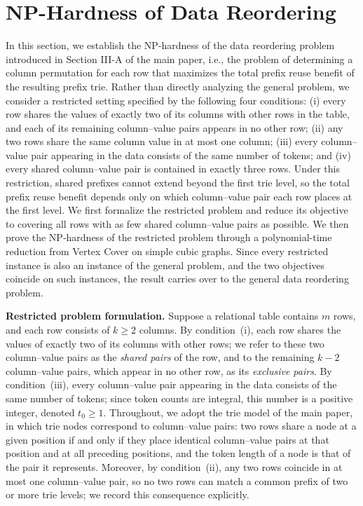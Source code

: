 \section{NP-Hardness of Data Reordering}
\label{sec:supp-np-hardness}

In this section, we establish the NP-hardness of the data reordering problem introduced in Section III-A of the main paper, i.e., the problem of determining a column permutation for each row that maximizes the total prefix reuse benefit of the resulting prefix trie. Rather than directly analyzing the general problem, we consider a restricted setting specified by the following four conditions:
(i) every row shares the values of exactly two of its columns with other rows in the table, and each of its remaining column--value pairs appears in no other row;
(ii) any two rows share the same column value in at most one column;
(iii) every column--value pair appearing in the data consists of the same number of tokens; and
(iv) every shared column--value pair is contained in exactly three rows.
Under this restriction, shared prefixes cannot extend beyond the first trie level, so the total prefix reuse benefit depends only on which column--value pair each row places at the first level. We first formalize the restricted problem and reduce its objective to covering all rows with as few shared column--value pairs as possible. We then prove the NP-hardness of the restricted problem through a polynomial-time reduction from Vertex Cover on simple cubic graphs. Since every restricted instance is also an instance of the general problem, and the two objectives coincide on such instances, the result carries over to the general data reordering problem.

\textbf{Restricted problem formulation.}
Suppose a relational table contains $m$ rows, and each row consists of $k \geq 2$ columns. By condition~(i), each row shares the values of exactly two of its columns with other rows; we refer to these two column--value pairs as the \emph{shared pairs} of the row, and to the remaining $k-2$ column--value pairs, which appear in no other row, as its \emph{exclusive pairs}. By condition~(iii), every column--value pair appearing in the data consists of the same number of tokens; since token counts are integral, this number is a positive integer, denoted $t_0\geq 1$. Throughout, we adopt the trie model of the main paper, in which trie nodes correspond to column--value pairs: two rows share a node at a given position if and only if they place identical column--value pairs at that position and at all preceding positions, and the token length of a node is that of the pair it represents. Moreover, by condition~(ii), any two rows coincide in at most one column--value pair, so no two rows can match a common prefix of two or more trie levels; we record this consequence explicitly.

